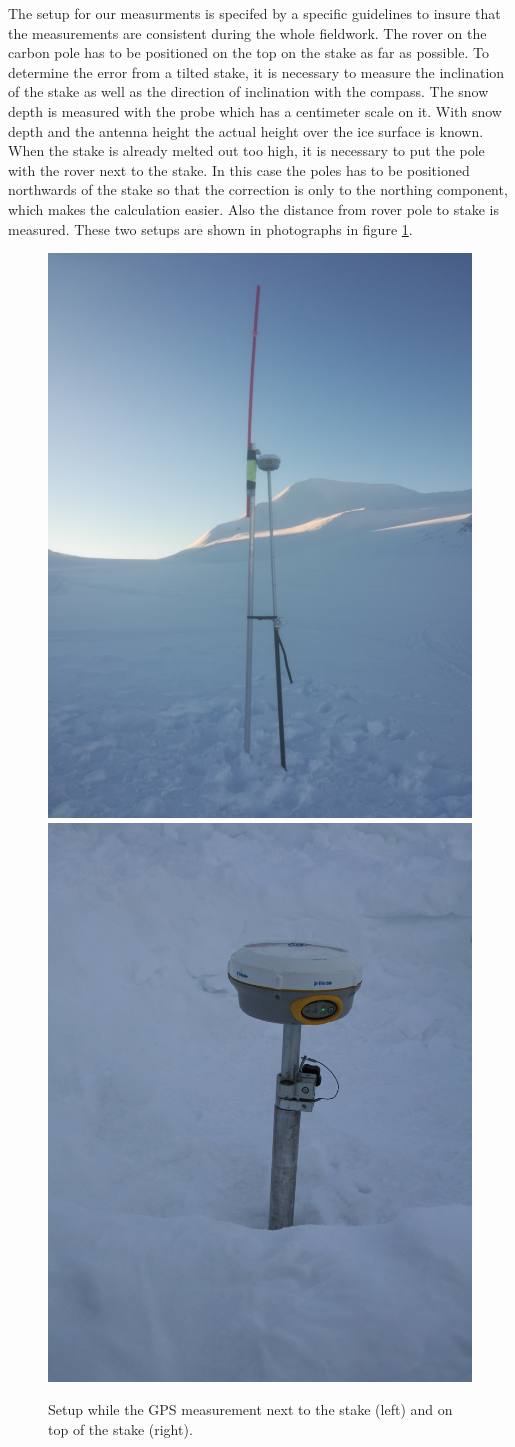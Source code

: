 The setup for our measurments is specifed by a specific guidelines to insure that the measurements are consistent during the whole fieldwork.
The rover on the carbon pole has to be positioned on the top on the stake as far as possible. 
To determine the error from a tilted stake, it is necessary to measure the inclination of the stake as well as the direction of inclination with the compass.
The snow depth is measured with the probe which has a centimeter scale on it.
With snow depth and the antenna height the actual height over the ice surface is known. 
When the stake is already melted out too high, it is necessary to put the pole with the rover next to the stake. 
In this case the poles has to be positioned northwards of the stake so that the correction is only to the northing component, which makes the calculation easier. 
Also the distance from rover pole to stake is measured.
These two setups are shown in photographs in figure \ref{GPS:fig:setup}.

\begin{figure}
\centering
\includegraphics[width=0.48\linewidth]{./figs/pictures/GPS_setup.jpg}
\includegraphics[width=0.485\linewidth]{./figs/pictures/setup_ontop.JPG}
\caption{Setup while the GPS measurement next to the stake (left) and on top of the stake (right).}
\label{GPS:fig:setup}
\end{figure}
